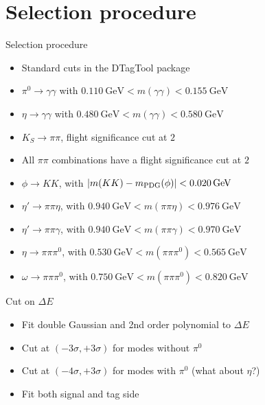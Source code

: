\documentclass{beamer}
\begin{document}
\section{Selection procedure}
\begin{frame}{Selection procedure}
  \begin{itemize}
    \item{Standard cuts in the DTagTool package}
    \item{$\pi^0\to\gamma\gamma$ with $\SI{0.110}{\giga\eV} < m(\gamma\gamma) < \SI{0.155}{\giga\eV}$}
    \item{$\eta\to\gamma\gamma$ with $\SI{0.480}{\giga\eV} < m(\gamma\gamma) < \SI{0.580}{\giga\eV}$}
    \item{$K_S\to\pi\pi$, flight significance cut at $2$}
    \item{All $\pi\pi$ combinations have a flight significance cut at $2$}
    \item{$\phi\to KK$, with $\abs{m(KK) - m_{\text{PDG}}(\phi)} < \SI{0.020}{\giga\eV}$}
    \item{$\eta'\to\pi\pi\eta$, with $\SI{0.940}{\giga\eV} < m(\pi\pi\eta) < \SI{0.976}{\giga\eV}$}
    \item{$\eta'\to\pi\pi\gamma$, with $\SI{0.940}{\giga\eV} < m(\pi\pi\gamma) < \SI{0.970}{\giga\eV}$}
    \item{$\eta\to\pi\pi\pi^0$, with $\SI{0.530}{\giga\eV} < m(\pi\pi\pi^0) < \SI{0.565}{\giga\eV}$}
    \item{$\omega\to\pi\pi\pi^0$, with $\SI{0.750}{\giga\eV} < m(\pi\pi\pi^0) < \SI{0.820}{\giga\eV}$}
  \end{itemize}
\end{frame}

\begin{frame}{Cut on $\Delta E$}
  \begin{itemize}
    \item{Fit double Gaussian and 2nd order polynomial to $\Delta E$}
    \item{Cut at $(-3\sigma, +3\sigma)$ for modes without $\pi^0$}
    \item{Cut at $(-4\sigma, +3\sigma)$ for modes with $\pi^0$ (what about $\eta$?)}
    \item{Fit both signal and tag side}
  \end{itemize}
\end{frame}
\end{document}
